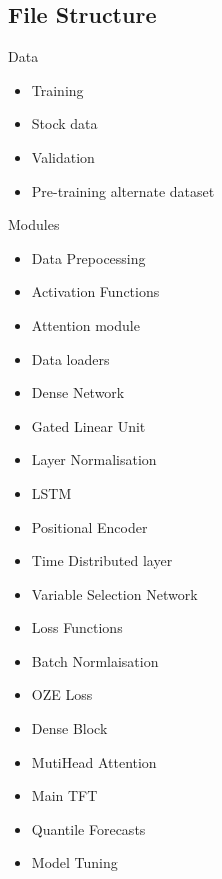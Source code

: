 \documentclass{article}
\begin{document}
\subsection{File Structure}
Data
\begin{itemize}
\item Training
\item Stock data
\item Validation
\item Pre-training alternate dataset
\end{itemize}
Modules
\begin{itemize}
\item Data Prepocessing
\item Activation Functions
\item Attention module
\item Data loaders
\item Dense Network
\item Gated Linear Unit
\item Layer Normalisation
\item LSTM
\item Positional Encoder
\item Time Distributed layer
\item Variable Selection Network
\item Loss Functions
\item Batch Normlaisation
\item OZE Loss
\item Dense Block
\item MutiHead Attention
\item Main TFT
\item Quantile Forecasts
\item Model Tuning
\end{itemize}
\end{document}
